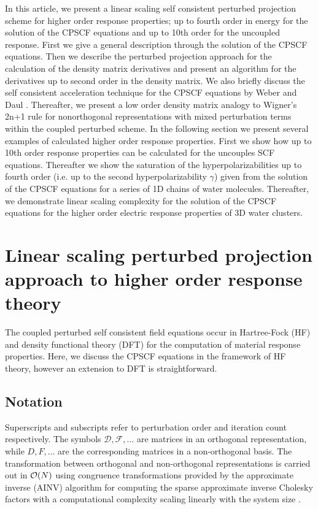 \documentclass[prl,aps,letterpaper,twocolumn,showpacs,twocolumngrid,superbib]{revtex4}
\begin{document}
 In this article, we present a linear scaling self consistent perturbed projection scheme
 for higher order response properties; up to fourth order in energy for
 the solution of the CPSCF equations and up to 10th order for the uncoupled response.
 First we give a general description through the solution of the CPSCF equations.
 Then we describe the perturbed projection approach for the calculation
 of the density matrix derivatives and present
 an algorithm for the derivatives up to second order in the density matrix.
 We also briefly discuss the self consistent acceleration technique for the 
 CPSCF equations by Weber and Daul \cite{Weber_2003}.
 Thereafter, we present a low order density matrix analogy to Wigner's 2n+1 rule 
 for nonorthogonal representations with mixed perturbation terms within the
 coupled perturbed scheme.  In the following section we present several examples
 of calculated higher order response properties. First we show how up to 10th
 order response properties can be calculated for the uncouples SCF equations.
 Thereafter we show the saturation of the hyperpolarizabilities up to 
 fourth order (i.e. up to the second hyperpolarizability $\gamma$) given from
 the solution of the CPSCF equations for a series of 1D chains of water molecules. 
 Thereafter, we demonstrate linear scaling complexity for the solution of the CPSCF
 equations for the higher order electric response properties of 3D water clusters.

\section{Linear scaling perturbed projection approach to higher order response theory}


The coupled perturbed self consistent field equations occur in Hartree-Fock (HF)
and density functional theory (DFT) for the computation of material response
properties. Here, we discuss the CPSCF equations in the framework of
HF theory, however an extension to DFT is straightforward.

\subsection{Notation}

Superscripts and subscripts refer to perturbation order and 
iteration count respectively. The symbols $\mathcal{D},\mathcal{F},\dots$
are matrices in an orthogonal representation, while
$D,F,\dots$ are the corresponding matrices in a non-orthogonal basis.
The transformation between orthogonal and non-orthogonal 
representations is carried out in ${\cal O}(N)$ using
congruence transformations \cite{JWilkinson65,GStewart73} provided 
by the approximate inverse (AINV) algorithm for computing the sparse 
approximate inverse Cholesky factors with a computational complexity
scaling linearly with the system size \cite{MBenzi95,MBenzi96,MBenzi01}.
\end{document}
